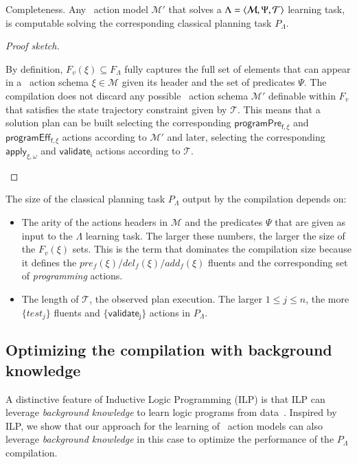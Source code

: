 \begin{mylemma}
Completeness. Any \strips\ action model $\mathcal{M}'$ that solves a $\Lambda={\langle \mathcal{M},\Psi,\mathcal{T} \rangle}$ learning task, is computable solving the corresponding classical planning task $P_{\Lambda}$.
\end{mylemma}

\begin{proof}[Proof sketch]
\begin{small}
  By definition, $F_v(\xi)\subseteq F_\Lambda$ fully captures the full set of elements that can appear in a \strips\ action schema $\xi\in\mathcal{M}$ given its header and the set of predicates $\Psi$. The compilation does not discard any possible \strips\ action schema $\mathcal{M}'$ definable within $F_v$ that satisfies the state trajectory constraint given by $\mathcal{T}$. This means that a solution plan can be built selecting the corresponding  $\mathsf{programPre_{f,\xi}}$ and $\mathsf{programEff_{f,\xi}}$ actions according to $\mathcal{M}'$ and later, selecting the corresponding $\mathsf{apply_{\xi,\omega}}$ and $\mathsf{validate_{i}}$ actions according to $\mathcal{T}$.
\end{small}
\end{proof}

The size of the classical planning task $P_{\Lambda}$ output by the compilation depends on:
\begin{itemize}
\item The arity of the actions headers in $\mathcal{M}$ and the predicates $\Psi$ that are given as input to the $\Lambda$ learning task. The larger these numbers, the larger the size of the $F_v(\xi)$ sets. This is the term that dominates the compilation size because it defines the $pre_f(\xi)/del_f(\xi)/add_f(\xi)$ fluents and the corresponding set of {\em programming} actions.
\item The length of $\mathcal{T}$, the observed plan execution. The larger $1\leq j\leq n$, the more $\{test_j\}$ fluents and $\{\mathsf{validate_{j}}\}$ actions in $P_{\Lambda}$.
\end{itemize}

\subsection{Optimizing the compilation with background knowledge}
A distinctive feature of Inductive Logic Programming (ILP) is that ILP can leverage {\em background knowledge} to learn logic programs from data~\cite{muggleton1994inductive}. Inspired by ILP, we show that our approach for the learning of \strips\ action models can also leverage {\em background knowledge} in this case to optimize the performance of the $P_{\Lambda}$ compilation.

